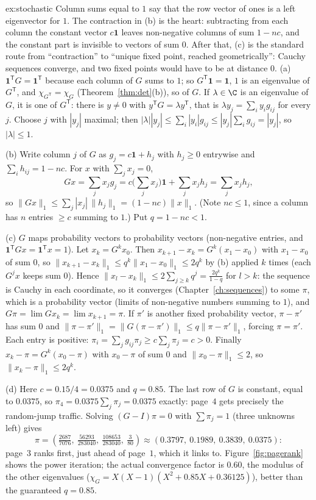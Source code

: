 \begin{solution}{ex:stochastic}
\idea Column sums equal to $1$ say that the row vector of ones is a left eigenvector for $1$. The contraction in (b) is the heart: subtracting from each column the constant vector $c\mathbf 1$ leaves non-negative columns of sum $1-nc$, and the constant part is invisible to vectors of sum $0$. After that, (c) is the standard route from ``contraction'' to ``unique fixed point, reached geometrically'': Cauchy sequences converge, and two fixed points would have to be at distance $0$.
\writeup (a) $\mathbf 1^{\mathsf T}G=\mathbf 1^{\mathsf T}$ because each column of $G$ sums to $1$; so $G^{\mathsf T}\mathbf 1=\mathbf 1$, $1$ is an eigenvalue of $G^{\mathsf T}$, and $\chi_{G^{\mathsf T}}=\chi_G$ (Theorem~\ref{thm:det}(b)), so of $G$. If $\lambda\in\C$ is an eigenvalue of $G$, it is one of $G^{\mathsf T}$: there is $y\ne0$ with $y^{\mathsf T}G=\lambda y^{\mathsf T}$, that is $\lambda y_j=\sum_iy_ig_{ij}$ for every $j$. Choose $j$ with $|y_j|$ maximal; then $|\lambda||y_j|\le\sum_i|y_i|g_{ij}\le|y_j|\sum_ig_{ij}=|y_j|$, so $|\lambda|\le1$.

(b) Write column $j$ of $G$ as $g_j=c\mathbf 1+h_j$ with $h_j\ge0$ entrywise and $\sum_ih_{ij}=1-nc$. For $x$ with $\sum_jx_j=0$,
\[
Gx=\sum_jx_jg_j=c\Big(\sum_jx_j\Big)\mathbf 1+\sum_jx_jh_j=\sum_jx_jh_j ,
\]
so $\|Gx\|_1\le\sum_j|x_j|\,\|h_j\|_1=(1-nc)\|x\|_1$. (Note $nc\le1$, since a column has $n$ entries $\ge c$ summing to $1$.) Put $q=1-nc<1$.

(c) $G$ maps probability vectors to probability vectors (non-negative entries, and $\mathbf 1^{\mathsf T}Gx=\mathbf 1^{\mathsf T}x=1$). Let $x_k=G^kx_0$. Then $x_{k+1}-x_k=G^k(x_1-x_0)$ with $x_1-x_0$ of sum $0$, so $\|x_{k+1}-x_k\|_1\le q^k\|x_1-x_0\|_1\le2q^k$ by (b) applied $k$ times (each $G^jx$ keeps sum $0$). Hence $\|x_l-x_k\|_1\le2\sum_{j\ge k}q^j=\frac{2q^k}{1-q}$ for $l>k$: the sequence is Cauchy in each coordinate, so it converges (Chapter~\ref{ch:sequences}) to some $\pi$, which is a probability vector (limits of non-negative numbers summing to $1$), and $G\pi=\lim Gx_k=\lim x_{k+1}=\pi$. If $\pi'$ is another fixed probability vector, $\pi-\pi'$ has sum $0$ and $\|\pi-\pi'\|_1=\|G(\pi-\pi')\|_1\le q\|\pi-\pi'\|_1$, forcing $\pi=\pi'$. Each entry is positive: $\pi_i=\sum_jg_{ij}\pi_j\ge c\sum_j\pi_j=c>0$. Finally $x_k-\pi=G^k(x_0-\pi)$ with $x_0-\pi$ of sum $0$ and $\|x_0-\pi\|_1\le2$, so $\|x_k-\pi\|_1\le2q^k$.

(d) Here $c=0.15/4=0.0375$ and $q=0.85$. The last row of $G$ is constant, equal to $0.0375$, so $\pi_4=0.0375\sum_j\pi_j=0.0375$ exactly: page~$4$ gets precisely the random-jump traffic. Solving $(G-I)\pi=0$ with $\sum\pi_j=1$ (three unknowns left) gives
\[
\pi=\left(\tfrac{2687}{7076},\ \tfrac{56293}{283040},\ \tfrac{108653}{283040},\ \tfrac{3}{80}\right)\approx(0.3797,\ 0.1989,\ 0.3839,\ 0.0375):
\]
page~$3$ ranks first, just ahead of page~$1$, which it links to. Figure~\ref{fig:pagerank} shows the power iteration; the actual convergence factor is $0.60$, the modulus of the other eigenvalues ($\chi_G=X(X-1)(X^2+0.85X+0.36125)$), better than the guaranteed $q=0.85$.
\end{solution}

